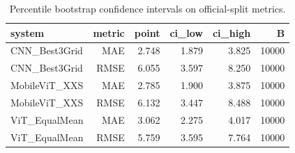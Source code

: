\begin{table}[htbp]
\centering
\caption{Percentile bootstrap confidence intervals on official-split metrics.}
\label{tab:bootstrap-cis}
\begin{tabular}{lrrrrr}
\toprule
system & metric & point & ci\_low & ci\_high & B \\
\midrule
CNN\_Best3Grid & MAE & 2.748 & 1.879 & 3.825 & 10000 \\
CNN\_Best3Grid & RMSE & 6.055 & 3.597 & 8.250 & 10000 \\
MobileViT\_XXS & MAE & 2.785 & 1.900 & 3.875 & 10000 \\
MobileViT\_XXS & RMSE & 6.132 & 3.447 & 8.488 & 10000 \\
ViT\_EqualMean & MAE & 3.062 & 2.275 & 4.017 & 10000 \\
ViT\_EqualMean & RMSE & 5.759 & 3.595 & 7.764 & 10000 \\
\bottomrule
\end{tabular}
\end{table}

